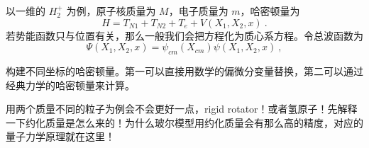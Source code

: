 
\begin{issues}
\issueDraft
\end{issues}

以一维的 $H_2^+$ 为例，原子核质量为 $M$，电子质量为 $m$，哈密顿量为
\begin{equation}
H = T_{N1} + T_{N2} + T_{e} + V(X_1,X_2,x)~.
\end{equation}
若势能函数只与位置有关，那么一般我们会把方程化为质心系方程。令总波函数为
\begin{equation}
\Psi(X_1,X_2,x) = \psi_{cm}(X_{cm})\psi(X_1,X_2,x)~,
\end{equation}

构建不同坐标的哈密顿量。第一可以直接用数学的偏微分变量替换，第二可以通过经典力学的哈密顿量来计算。

用两个质量不同的粒子为例会不会更好一点，rigid rotator！或者氢原子！先解释一下约化质量是怎么来的！为什么玻尔模型用约化质量会有那么高的精度，对应的量子力学原理就在这里！